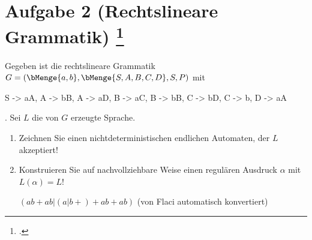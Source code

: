 \documentclass{bschlangaul-aufgabe}
\begin{document}
\let\m=\bMenge

\section{Aufgabe 2 (Rechtslineare Grammatik)
\footcite{examen:46115:2019:09}}

Gegeben ist die rechtslineare Grammatik
$G = (\m{a, b}, \m{S, A, B, C, D}, S, P)$ mit
\begin{liProduktionsRegeln}
S -> aA,
A -> bB,
A -> aD,
B -> aC,
B -> bB,
C -> bD,
C -> b,
D -> aA
\end{liProduktionsRegeln}. Sei $L$ die von $G$ erzeugte Sprache.

\begin{enumerate}


\item Zeichnen Sie einen nichtdeterministischen endlichen Automaten, der
$L$ akzeptiert!

\begin{liAntwort}
\begin{center}
\end{center}
\end{liAntwort}


\item Konstruieren Sie auf nachvollziehbare Weise einen regulären
Ausdruck $\alpha$ mit $L(\alpha)=L$!

\begin{liAntwort}
$(ab+ab|(a|b+)+ab+ab)$
(von Flaci automatisch konvertiert)
\end{liAntwort}

\end{enumerate}
\end{document}
